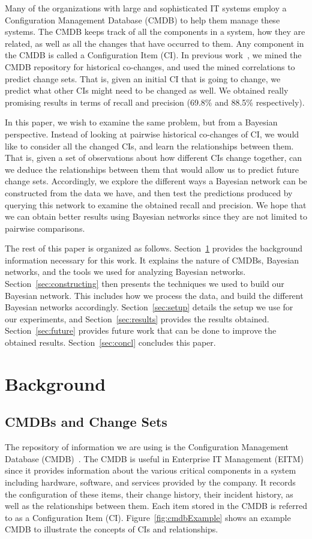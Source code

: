 \documentclass[10pt,twocolumn,letterpaper]{article}
\begin{document}
Many of the organizations with large and sophisticated IT systems employ a Configuration Management Database (CMDB) to help them manage these systems.
The CMDB keeps track of all the components in a system, how they are related, as well as all the changes that have occurred to them. Any component in the CMDB
is called a Configuration Item (CI). In previous work~\cite{nadi2010}, we mined the CMDB repository for historical co-changes, and used the mined correlations
to predict change sets. That is, given an initial CI that is going to change, we predict what other CIs might need to be changed as well. We obtained really
promising results in terms of recall and precision (69.8\% and 88.5\% respectively). 

In this paper, we wish to examine the same problem, but from a Bayesian perspective. Instead of looking at pairwise historical co-changes of CI, we would like
to consider all the changed CIs, and learn the relationships between them. That is, given a set of observations about how different CIs change
together, can we deduce the relationships between them that would allow us to predict future change sets. Accordingly, we explore the different ways a Bayesian
network can be constructed from the data we have, and then test the predictions produced by querying this network to examine the obtained recall and precision.
We hope that we can obtain better results using Bayesian networks since they are not limited to pairwise comparisons. 

The rest of this paper is organized as follows. Section~\ref{sec:bg} provides the background information necessary for this work. It explains the nature of
CMDBs, Bayesian networks, and the tools we used for analyzing Bayesian networks. Section~\ref{sec:constructing} then presents the techniques we used to build
our Bayesian network. This includes how we process the data, and build the different Bayesian networks accordingly. Section~\ref{sec:setup} details the
setup we use for our experiments, and Section~\ref{sec:results} provides the results obtained. Section~\ref{sec:future} provides future work that can be done
to improve the obtained results. Section~\ref{sec:concl} concludes this paper.


\section{Background}
\label{sec:bg}

\subsection{CMDBs and Change Sets}
The repository of information we are using is the Configuration Management Database (CMDB)~\cite{itil}. The CMDB is useful in Enterprise IT Management (EITM)
since it provides information about the various critical components in a system including hardware, software, and services provided by the company. It records
the configuration of these items, their change history, their incident history, as well as the relationships between them. Each item stored in the CMDB is
referred to as a Configuration Item (CI). Figure~\ref{fig:cmdbExample} shows an example CMDB to illustrate the concepts of CIs and relationships.
\end{document}
